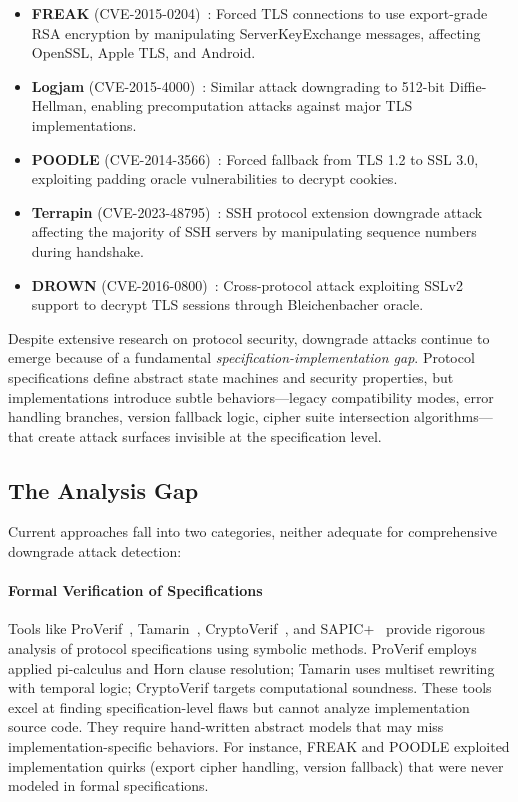 \documentclass[10pt,twocolumn]{article}
\begin{document}
\begin{itemize}[leftmargin=*,noitemsep]
\item \textbf{FREAK} (CVE-2015-0204)~\cite{beurdouche2015messy}: Forced TLS connections to use export-grade RSA encryption by manipulating ServerKeyExchange messages, affecting OpenSSL, Apple TLS, and Android.
\item \textbf{Logjam} (CVE-2015-4000)~\cite{adrian2015imperfect}: Similar attack downgrading to 512-bit Diffie-Hellman, enabling precomputation attacks against major TLS implementations.
\item \textbf{POODLE} (CVE-2014-3566)~\cite{moller2014poodle}: Forced fallback from TLS 1.2 to SSL 3.0, exploiting padding oracle vulnerabilities to decrypt cookies.
\item \textbf{Terrapin} (CVE-2023-48795)~\cite{baumer2024terrapin}: SSH protocol extension downgrade attack affecting the majority of SSH servers by manipulating sequence numbers during handshake.
\item \textbf{DROWN} (CVE-2016-0800)~\cite{aviram2016drown}: Cross-protocol attack exploiting SSLv2 support to decrypt TLS sessions through Bleichenbacher oracle.
\end{itemize}

Despite extensive research on protocol security, downgrade attacks continue to emerge because of a fundamental \emph{specification-implementation gap}. Protocol specifications define abstract state machines and security properties, but implementations introduce subtle behaviors—legacy compatibility modes, error handling branches, version fallback logic, cipher suite intersection algorithms—that create attack surfaces invisible at the specification level.

\subsection{The Analysis Gap}

Current approaches fall into two categories, neither adequate for comprehensive downgrade attack detection:

\paragraph{Formal Verification of Specifications}
Tools like ProVerif~\cite{blanchet2016modeling}, Tamarin~\cite{meier2013tamarin}, CryptoVerif~\cite{blanchet2006cryptoverif}, and SAPIC+~\cite{kremer2014sapic} provide rigorous analysis of protocol specifications using symbolic methods. ProVerif employs applied pi-calculus and Horn clause resolution; Tamarin uses multiset rewriting with temporal logic; CryptoVerif targets computational soundness. These tools excel at finding specification-level flaws but cannot analyze implementation source code. They require hand-written abstract models that may miss implementation-specific behaviors. For instance, FREAK and POODLE exploited implementation quirks (export cipher handling, version fallback) that were never modeled in formal specifications.
\end{document}
